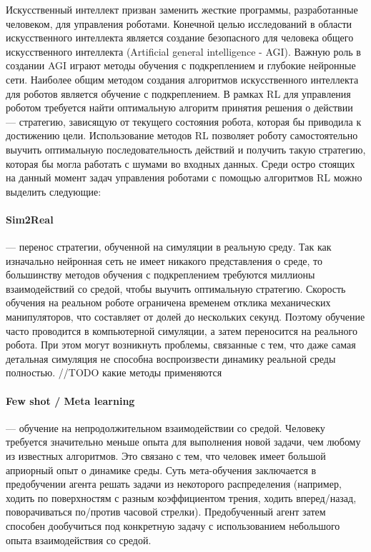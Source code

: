 Искусственный интеллект призван заменить жесткие программы, разработанные человеком, для управления роботами. Конечной целью исследований в области искусственного интеллекта является создание безопасного для человека общего искусственного интеллекта (Artificial general intelligence - AGI). Важную роль в создании AGI играют методы обучения с подкреплением и глубокие нейронные сети. 
Наиболее общим методом создания алгоритмов искусственного интеллекта для роботов является обучение с подкреплением. В рамках RL для управления роботом требуется найти оптимальную алгоритм принятия решения о действии –-- стратегию, зависящую от текущего состояния робота, которая бы приводила к достижению цели. Использование методов RL позволяет роботу самостоятельно выучить оптимальную последовательность действий и получить такую стратегию, которая бы могла работать с шумами во входных данных. Среди остро стоящих на данный момент задач управления роботами с помощью алгоритмов RL можно выделить следующие:

\paragraph{Sim2Real} --- перенос стратегии, обученной на симуляции в реальную среду. Так как изначально нейронная сеть не имеет никакого представления о среде, то большинству методов обучения с подкреплением требуются миллионы взаимодействий со средой, чтобы выучить оптимальную стратегию. Скорость обучения на реальном роботе ограничена временем отклика механических манипуляторов, что составляет от долей до нескольких секунд. Поэтому обучение часто проводится в компьютерной симуляции, а затем переносится на реального робота. При этом могут возникнуть проблемы, связанные с тем, что даже самая детальная симуляция не способна воспроизвести динамику реальной среды полностью. 
//TODO какие методы применяются 

\paragraph{Few shot / Meta learning} --- обучение на непродолжительном взаимодействии со средой. Человеку требуется значительно меньше опыта для выполнения новой задачи, чем любому из известных алгоритмов. Это связано с тем, что человек имеет большой априорный опыт о динамике среды. Суть мета-обучения заключается в предобучении агента решать задачи из некоторого распределения (например, ходить по поверхностям с разным коэффициентом трения, ходить вперед/назад, поворачиваться по/против часовой стрелки). Предобученный агент затем способен дообучиться под конкретную задачу с использованием небольшого опыта взаимодействия со средой. 

